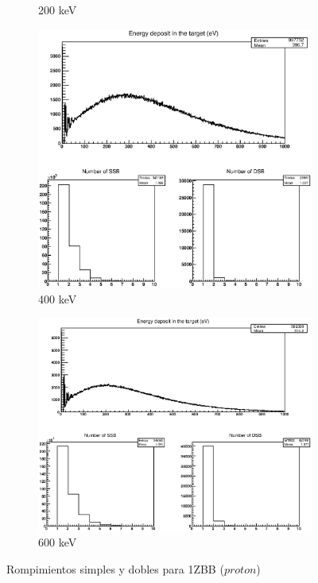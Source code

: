 \begin{figure}
\begin{subfigure}{.5\textwidth}
  \caption{200 keV}
  \label{fig:sub6}
\end{subfigure}
\begin{subfigure}{.5\textwidth}
  \centering
  \includegraphics[width=.78\linewidth]{./Figures/1zbbp400kev.eps}
  \caption{400 keV}
  \label{fig:sub7}
\end{subfigure}%
\begin{subfigure}{.5\textwidth}
  \centering
  \includegraphics[width=.78\linewidth]{./Figures/1zbbp600kev.eps}
  \caption{600 keV}
  \label{fig:sub8}
\end{subfigure}
\caption{Rompimientos simples y dobles para 1ZBB ($proton$)}
\label{fig:p}
\end{figure}



